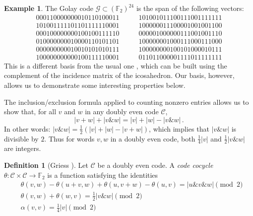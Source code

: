 \documentclass{article}
\theoremstyle{plain}
\theoremstyle{definition}
\newtheorem*{definition}{Definition}
\newtheorem{example}{Example}
\def \cC {\mathcal{C}}
\def \cG {\mathcal{G}}
\def \FF {\mathbb{F}}
\newcommand{\AND}{\mathbin{\texttt{\&}}}
\begin{document}
\begin{example}\label{example:Golay}
The Golay code $\cG \subset (\FF_2)^{24}$ is the span of the following vectors:
\[	
	 \begin{array}{c}
     000110000000010110100011 \\
     101001111101101111110001 \\
     000100000000100100111110 \\
     010000000010000110101101 \\
     000000000010010101010111 \\
     100000000000100111110001
     \end{array}
\qquad
    \begin{array}{c}
	 101001011100111001111111 \\
	 100000011100001001001100 \\
	 000001000000111001001110 \\
	 100000001000111000111000 \\
	 100000000100101000010111 \\
	 011011000001111011111111
	 \end{array}
\]
This is a different basis from the usual one \cite{Thompson}, which can be built using the complement of the incidence matrix of the icosahedron. 
Our basis, however, allows us to demonstrate some interesting properties below.
\end{example}

The inclusion/exclusion formula applied to counting nonzero entries allows us to show that, for all $v$ and $w$ in any doubly even code $\cC$,
\[
	|v+w| + |v\AND w| = |v| + |w| - |v\AND w|\,.
\]
In other words: $|v\AND w| = \frac12(|v| + |w| - |v+w|)$, which implies that $|v\AND w|$ is divisible by $2$.
Thus for words $v,w$ in a doubly even code, both $\frac14|v|$ and $\frac12|v\AND w|$ are integers.

\begin{definition}[Griess \cite{Griess}]
Let $\cC$ be a doubly even code. 
A \emph{code cocycle} $\theta\colon \cC \times \cC \to \FF_2$ is a function satisfying the identities
\begin{align}
& \theta(v,w)-\theta(u+v,w)+\theta(u,v+w)-\theta(u,v) =|u\AND v \AND w| \pmod 2 \label{eq: code cocycle 1}\\
& \theta(v,w)+\theta(w,v) = {}  \tfrac12|v\AND w| \pmod 2 \label{eq: code cocycle 2}\\
& \alpha(v,v) = {}  \tfrac14|v| \pmod 2\label{eq: code cocycle 3}
\end{align}
\end{definition}
\end{document}
